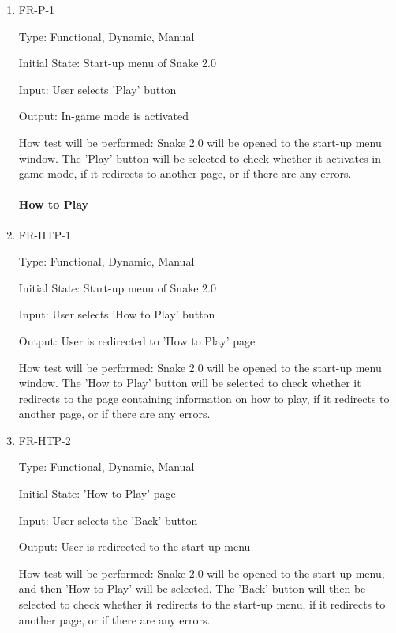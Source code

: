 \documentclass[12pt, titlepage]{article}
\begin{document}
\begin{enumerate}

\item{FR-P-1\\}
\label{fr:p-1}

Type: Functional, Dynamic, Manual
					
Initial State: Start-up menu of Snake 2.0
					
Input: User selects 'Play' button
					
Output: In-game mode is activated
					
How test will be performed: Snake 2.0 will be opened to the start-up menu window. The 'Play' button will be selected to check whether it activates in-game mode, if it redirects to another page, or if there are any errors.   
			
\paragraph{How to Play}
		
\item{FR-HTP-1\\}
\label{fr:htp-1}

Type: Functional, Dynamic, Manual
					
Initial State: Start-up menu of Snake 2.0
					
Input: User selects 'How to Play' button
					
Output: User is redirected to 'How to Play' page
					
How test will be performed: Snake 2.0 will be opened to the start-up menu window. The 'How to Play' button will be selected to check whether it redirects to the page containing information on how to play, if it redirects to another page, or if there are any errors.   

\item{FR-HTP-2}
\label{fr:htp-2}

Type: Functional, Dynamic, Manual

Initial State: 'How to Play' page 

Input: User selects the 'Back' button

Output: User is redirected to the start-up menu

How test will be performed: Snake 2.0 will be opened to the start-up menu, and then 'How to Play' will be selected. The 'Back' button will then be selected to check whether it redirects to the start-up menu, if it redirects to another page, or if there are any errors.   


\end{enumerate}
\end{document}
